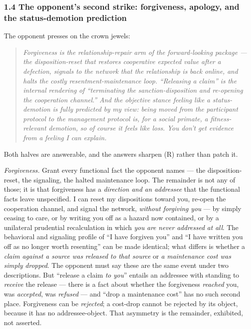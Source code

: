 \documentclass[11pt]{article}
\begin{document}
\subsubsection*{1.4 The opponent's second strike: forgiveness, apology, and the status-demotion prediction}

The opponent presses on the crown jewels:

\begin{quote}
\emph{Forgiveness is the relationship-repair arm of the forward-looking package — the disposition-reset that restores cooperative expected value after a defection, signals to the network that the relationship is back online, and halts the costly resentment-maintenance loop. ``Releasing a claim'' is the internal rendering of ``terminating the sanction-disposition and re-opening the cooperation channel.'' And the objective stance feeling like a status-demotion is fully predicted by my view: being moved from the participant protocol to the management protocol is, for a social primate, a fitness-relevant demotion, so of course it feels like loss. You don't get evidence from a feeling I can explain.}
\end{quote}

Both halves are answerable, and the answers sharpen (R) rather than patch it.

\emph{Forgiveness.} Grant every functional fact the opponent names — the disposition-reset, the signaling, the halted maintenance loop. The remainder is not any of those; it is that forgiveness has a \emph{direction and an addressee} that the functional facts leave unspecified. I can reset my dispositions toward you, re-open the cooperation channel, and signal the network, \emph{without forgiving you} — by simply ceasing to care, or by writing you off as a hazard now contained, or by a unilateral prudential recalculation in which \emph{you are never addressed at all}. The behavioral and signaling profile of ``I have forgiven you'' and ``I have written you off as no longer worth resenting'' can be made identical; what differs is whether a \emph{claim against a source was released to that source} or \emph{a maintenance cost was simply dropped}. The opponent must say these are the same event under two descriptions. But ``release a claim \emph{to you}'' entails an addressee with standing to \emph{receive} the release — there is a fact about whether the forgiveness \emph{reached} you, was \emph{accepted}, was \emph{refused} — and ``drop a maintenance cost'' has no such second place. Forgiveness can be \emph{rejected}; a cost-drop cannot be rejected by its object, because it has no addressee-object. That asymmetry is the remainder, exhibited, not asserted.
\end{document}
